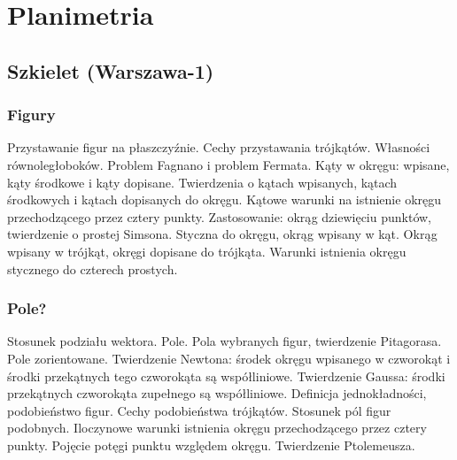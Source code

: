 \documentclass{LegrandOrangeBook}
\begin{document}
\tableofcontents

\pagestyle{fancy} %
\cleardoublepage %

\chapterspaceabove{5.75cm} %
\chapterspacebelow{7.25cm} %

\part{Planimetria}



\chapter{Szkielet (Warszawa-1)}
\section{Figury}
Przystawanie figur na płaszczyźnie. %
Cechy przystawania trójkątów. %
Własności równoległoboków. %
Problem Fagnano i problem Fermata. %
Kąty w okręgu: wpisane, kąty środkowe i kąty dopisane. %
Twierdzenia o kątach wpisanych, kątach środkowych i kątach dopisanych do okręgu. %
Kątowe warunki na istnienie okręgu przechodzącego przez cztery punkty. %
Zastosowanie: okrąg dziewięciu punktów, twierdzenie o prostej Simsona. %
Styczna do okręgu, okrąg wpisany w kąt. %
Okrąg wpisany w trójkąt, okręgi dopisane do trójkąta. %
Warunki istnienia okręgu stycznego do czterech prostych. %

\section{Pole?}
Stosunek podziału wektora.
Pole.
Pola wybranych figur, twierdzenie Pitagorasa.
Pole zorientowane.
Twierdzenie Newtona: środek okręgu wpisanego w czworokąt i środki przekątnych tego czworokąta są współliniowe.
Twierdzenie Gaussa: środki przekątnych czworokąta zupełnego są współliniowe.
Definicja jednokładności, podobieństwo figur.
Cechy podobieństwa trójkątów.
Stosunek pól figur podobnych.
Iloczynowe warunki istnienia okręgu przechodzącego przez cztery punkty.
Pojęcie potęgi punktu
względem okręgu.
Twierdzenie Ptolemeusza.
\end{document}
